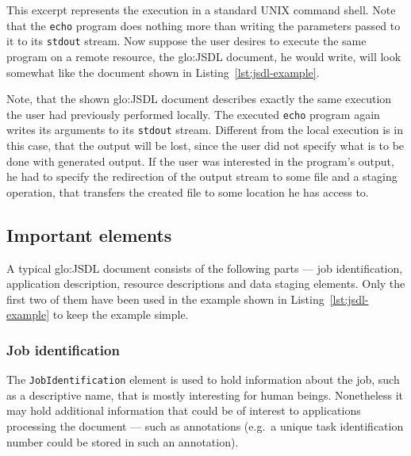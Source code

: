This  excerpt  represents  the   execution  in  a  standard  UNIX  command
shell. Note that the \texttt{echo}  program does nothing more than writing
the parameters passed to it to its \texttt{stdout} stream. Now suppose the
user  desires  to execute  the  same program  on  a  remote resource,  the
\gls{glo:JSDL}  document, he  would  write, will  look  somewhat like  the
document shown in Listing~\ref{lst:jsdl-example}.

\bigskip

\begin{center}
  \begin{minipage}{.75\textwidth}
    
  \end{minipage}
\end{center}

Note, that  the shown \gls{glo:JSDL}  document describes exactly  the same
execution  the  user  had  previously  performed  locally.   The  executed
\texttt{echo} program  again writes  its arguments to  its \texttt{stdout}
stream.   Different from the  local execution  is in  this case,  that the
output will  be lost, since the  user did not  specify what is to  be done
with generated output. If the user was interested in the program's output,
he had to specify the redirection of  the output stream to some file and a
staging operation, that transfers the created file to some location he has
access to.

\subsection{Important elements}

A typical \gls{glo:JSDL} document consists  of the following parts --- job
identification,  application description,  resource descriptions  and data
staging elements. Only the first two of them have been used in the example
shown in Listing~\ref{lst:jsdl-example} to keep the example simple.

\subsubsection{Job identification}

The \texttt{JobIdentification}  element is used to  hold information about
the job, such as a descriptive  name, that is mostly interesting for human
beings.  Nonetheless it  may hold additional information that  could be of
interest to  applications processing the document ---  such as annotations
(e.g.~a  unique task  identification number  could  be stored  in such  an
annotation).

